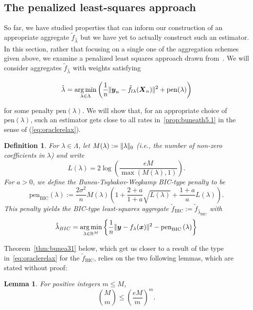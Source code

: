 \documentclass[11pt, letter paper]{article}
\newcommand{\1}{\mathmybb{1}}
\newtheorem{definition}{Definition}[section]
\newtheorem{lemma}[proposition]{Lemma}
\DeclareMathOperator*{\argmin}{arg\,min}
\newcommand{\R}{\mathbb{R}}
\newcommand{\0}{\emptyset}
\newcommand{\paren}[1]{\left(#1 \right)}
\newcommand{\set}[1]{\left\{ #1 \right\}}
\newcommand{\norm}[1]{|\hspace{-1pt}|#1 |\hspace{-1pt}|}
\newcommand{\normsq}[1]{\norm{#1}^{2}}
\newcommand{\X}{\boldsymbol{X}}
\newcommand{\x}{\boldsymbol{x}}
\newcommand{\y}{\boldsymbol{y}}
\newcommand{\ftilde}[1]{\tilde{f}_{#1}}
\newcommand{\lambdahat}[1]{\hat{\lambda}_{#1}}
\newcommand{\penBIC}[1]{\mathrm{pen}_{\mathrm{BIC}}\paren{#1}}
\begin{document}
\subsection{The penalized least-squares approach}

So far, we have studied properties that can inform our construction of an appropriate aggregate \(\ftilde{\lambdahat{}}\) but we have yet to actually construct such an estimator. In this section, rather that focusing on a single one of the aggregation schemes given above, we examine a penalized least squares approach drawn from~\textcite{bunea_2007}. We will consider aggregates \(\ftilde{\lambdahat{}}\) with weights satisfying

\begin{equation}\label{eq:weights}
    \lambdahat{}=\argmin_{\lambda\in\Lambda}\paren{\frac{1}{n}\normsq{\y_{n} - \ftilde{l\lambda}(\X_{n})} + \mathrm{pen}(\lambda)}
\end{equation}

for some penalty \(\mathrm{pen}(\lambda)\). We will show that, for an appropriate choice of \(\mathrm{pen}(\lambda)\), such an estimator gets close to all rates in~\ref{prop:buneath5.1} in the sense of (\ref{eq:oraclerelax}).

\begin{definition}\label{def:bic}
    For \(\lambda\in\Lambda\), let \(M(\lambda) := \norm{\lambda}_{0}\) (i.e., the number of non-zero coefficients in \(\lambda\)) and write
    \[L(\lambda) = 2\log\paren{\frac{eM}{\max(M(\lambda), 1)}}.\]
    For \(a>0\), we define the Bunea-Tsybakov-Wegkamp BIC-type penalty to be
    \[\penBIC{\lambda} := \frac{2\sigma^{2}}{n}M(\lambda)\paren{1+\frac{2+a}{1+a}\sqrt{L(\lambda)} + \frac{1+a}{a}{L(\lambda)}}.\]
    This penalty yields the BIC-type least-squares aggregate \(\ftilde{\mathrm{BIC}} := \ftilde{\lambdahat{\mathrm{BIC}}}\) with 
    \[\lambdahat{BIC}=\argmin_{\lambda\in\R^{M}}\set{\frac{1}{n}\normsq{\y - f_{\lambda}(\x)} - \penBIC{\lambda}}\]
\end{definition}

Theorem~\ref{thm:bunea31} below, which get us closer to a result of the type in~\ref{eq:oraclerelax} for the \(\ftilde{\mathrm{BIC}}\), relies on the two following lemmas, which are stated without proof:

\begin{lemma}\label{lemm:binombound}
    For positive integers \(m \leq M\),
    \[\binom{M}{m} \leq \paren{\frac{eM}{m}}^m.\]
\end{lemma}
\end{document}
